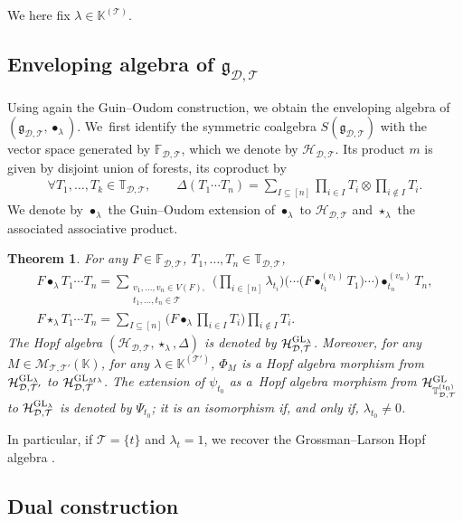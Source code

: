 \documentclass[pdftex]{sigma}
\numberwithin{equation}{section}
\newtheorem{Theorem}{Theorem}[section]
\newcommand{\K}{\mathbb{K}}
\newcommand{\T}{\mathcal{T}}
\newcommand{\D}{\mathcal{D}}
\newcommand{\g}{\mathfrak{g}}
\newcommand{\h}{\mathcal{H}}
\newcommand{\bfT}{\mathbb{T}}
\newcommand{\bfF}{\mathbb{F}}
\newcommand{\M}{\mathcal{M}}
\begin{document}
We here fix $\lambda\in \K^{(\T)}$.

\subsection[Enveloping algebra of g D,T]{Enveloping algebra of $\boldsymbol{\g_{\D,\T}}$}

Using again the Guin--Oudom construction, we obtain the enveloping algebra of $(\g_{\D,\T},\bullet_\lambda)$.
We~first identify the symmetric coalgebra $S(\g_{\D,\T})$ with the vector space generated by $\bfF_{\D,\T}$,
which we denote by $\h_{\D,\T}$.
Its product $m$ is given by disjoint union of forests, its coproduct by
\begin{gather*}
\forall T_1,\dots,T_k\in \bfT_{\D,\T},\qquad
\Delta(T_1\cdots T_n)=\sum_{I\subseteq [n]} \prod_{i\in I}T_i\otimes \prod_{i\notin I} T_i.
\end{gather*}
We denote by $\bullet_\lambda$ the Guin--Oudom extension of $\bullet_\lambda$ to $\h_{\D,\T}$ and $\star_\lambda$ the associated associative product.

\begin{Theorem}
For any $F\in \bfF_{\D,\T}$, $T_1,\dots,T_n \in \bfT_{\D,\T}$,
\begin{gather*}
F\bullet_\lambda T_1\cdots T_n=\sum_{\substack{v_1,\dots,v_n \in V(F),\\ t_1,\dots,t_n \in \T}}
\bigg(\prod_{i\in [n]} \lambda_{t_i}\bigg) \big(\cdots\big(F \bullet_{t_1}^{(v_1)}T_1\big)\cdots\big)\bullet_{t_n}^{(v_n)}T_n,
\\
F\star_\lambda T_1\cdots T_n=\sum_{I\subseteq [n]} \bigg(F\bullet_\lambda
\prod_{i\in I}T_i\bigg)\prod_{i\notin I} T_i.
\end{gather*}
The Hopf algebra $(\h_{\D,\T},\star_\lambda,\Delta)$ is denoted by $\h_{\D,\T}^{{\rm GL}_\lambda}$.
Moreover, for any $M\in \M_{\T,\T'}(\K)$, for any $\lambda\in \K^{(\T')}$,
$\Phi_M$ is a Hopf algebra morphism from $\h_{\D,\T'}^{{\rm GL}_\lambda}$ to $\h_{\D,\T}^{{\rm GL}_{M\lambda}}$.
The extension of $\psi_{t_0}$ as a~Hopf algebra morphism from $\h_{\bfT_{\D,\T}^{(t_0)}}^{{\rm GL}}$ to
$\h_{\D,\T}^{{\rm GL}_\lambda}$
is denoted by $\Psi_{t_0}$; it is an isomorphism if, and only if, $\lambda_{t_0}\neq 0$.
\end{Theorem}

In particular, if $\T=\{t\}$ and $\lambda_t=1$, we recover the Grossman--Larson Hopf algebra \cite{GrossmanLarson}.

\subsection{Dual construction}
\end{document}
